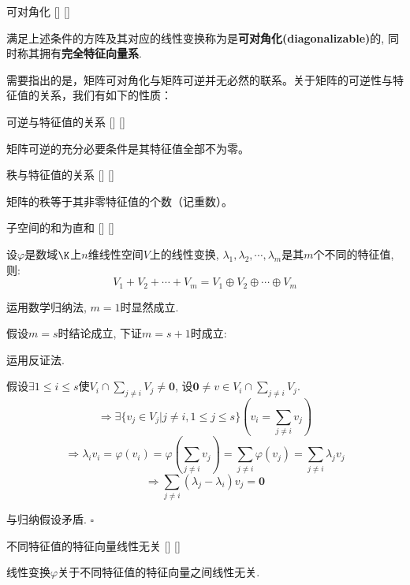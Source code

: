 \documentclass[UTF8]{ctexart}
\begin{document}
		\begin{dfn}
			[]
			{可对角化}
			[]
			[]

			满足上述条件的方阵及其对应的线性变换称为是\textbf{可对角化(diagonalizable)}的, 同时称其拥有\textbf{完全特征向量系}. 
		\end{dfn}

		需要指出的是，矩阵可对角化与矩阵可逆并无必然的联系。关于矩阵的可逆性与特征值的关系，我们有如下的性质：

		\begin{ppt}
			[]
			{可逆与特征值的关系}
			[]
			[]

			矩阵可逆的充分必要条件是其特征值全部不为零。
		\end{ppt}

		\begin{ppt}
			[]
			{秩与特征值的关系}
			[]
			[]

			矩阵的秩等于其非零特征值的个数（记重数）。
		\end{ppt}
		
		\begin{thm}
			[]
			{子空间的和为直和}
			[]
			[]

			设$\varphi$是数域$\K$上$n$维线性空间$V$上的线性变换, $\lambda_1,\lambda_2,\cdots,\lambda_m$是其$m$个不同的特征值, 则: 
			\[V_1+V_2+\cdots+V_m=V_1\oplus V_2\oplus\cdots\oplus V_m\]
		\end{thm}

		\begin{prf} 

			运用数学归纳法, $m=1$时显然成立. 

			假设$m=s$时结论成立, 下证$m=s+1$时成立: 

			运用反证法. 
			
			假设$\exists 1\leq i\leq s$使$V_i\cap\sum\limits_{j\neq i}V_j\neq\mathbf{0}$, 设$\mathbf{0}\neq v\in V_i\cap\sum\limits_{j\neq i}V_j$. 
			\[\Longrightarrow\exists\{v_j\in V_j|j\neq i,1\leq j\leq s\}\left(v_i=\sum_{j\neq i}v_j\right)\]
			\[\Longrightarrow\lambda_i v_i=\varphi(v_i)=\varphi\left(\sum_{j\neq i}v_j\right)=\sum_{j\neq i}\varphi(v_j)=\sum_{j\neq i}\lambda_j v_j\]
			\[\Longrightarrow\sum_{j\neq i}(\lambda_j-\lambda_i)v_j=\mathbf{0}\]

			与归纳假设矛盾. $\square$
            \end{prf}

		\begin{ppt}
			[]
			{不同特征值的特征向量线性无关}
			[]
			[]

			线性变换$\varphi$关于不同特征值的特征向量之间线性无关. 
		\end{ppt}
		
\end{document}
